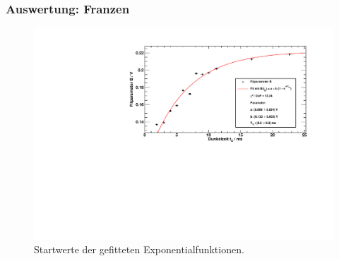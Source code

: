 \begin{frame}
\frametitle{Auswertung: Franzen}

\begin{figure}
    \centering
    \includegraphics[width=\textwidth]{../img/BFit.pdf}
    \caption{Startwerte der gefitteten Exponentialfunktionen.}  
\end{figure} 
  
\end{frame}